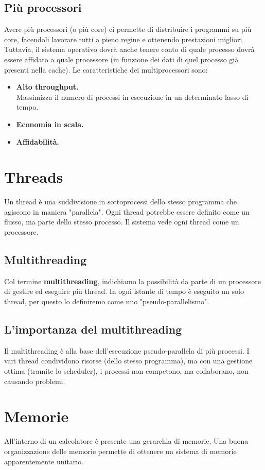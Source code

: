 \documentclass{report}
\begin{document}
\newpage

\subsection{Più processori}
Avere più processori (o più core) ci permette di distribuire i programmi su più core, facendoli lavorare tutti a pieno regine e ottenendo prestazioni migliori. Tuttavia, il sistema operativo dovrà anche tenere conto di quale processo dovrà essere affidato a quale processore (in funzione dei dati di quel processo già presenti nella cache).
Le caratteristiche dei multiprocessori sono:
\begin{itemize}
    \item \textbf{Alto throughput.}\\
    Massimizza il numero di processi in esecuzione in un determinato lasso di tempo.
    \item \textbf{Economia in scala.}
    \item \textbf{Affidabilità.}
\end{itemize}

\section{Threads}
Un thread è una suddivisione in sottoprocessi dello stesso programma che agiscono in maniera "parallela". Ogni thread potrebbe essere definito come un flusso, ma parte dello stesso processo. Il sistema vede ogni thread come un processore.
\subsection{Multithreading}
Col termine  \textbf{multithreading}, indichiamo la possibilità da parte di un processore di gestire ed eseguire più thread. In ogni istante di tempo è eseguito un solo thread, per questo lo definiremo come uno "pseudo-parallelismo".
\subsection{L'importanza del multithreading}
Il multithreading è alla base dell'esecuzione pseudo-parallela di più processi. I vari thread condividono risorse (dello stesso programma), ma con una gestione ottima (tramite lo scheduler), i processi non competono, ma collaborano, non causando problemi.

\newpage

\section{Memorie}
All'interno di un calcolatore è presente una gerarchia di memorie. Una buona organizzazione delle memorie permette di ottenere un sistema di memorie apparentemente unitario.
\end{document}
